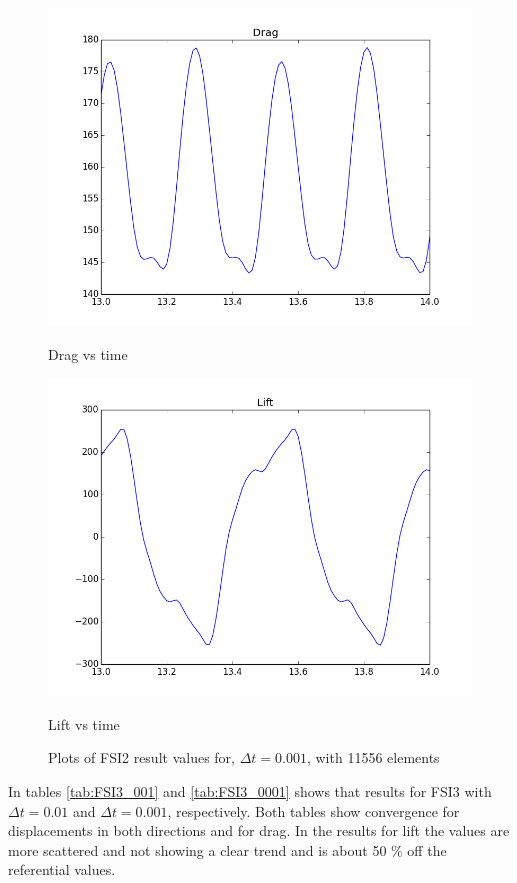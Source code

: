 \begin{figure}[H]
\begin{minipage}[b]{0.6\linewidth}
    \includegraphics[width=0.9\linewidth]{./Verification_Validation/Hron_Turek/FSI2_drag.png} 
    \caption{Drag vs time} 
    \vspace{4ex}
  \end{minipage}%
  \begin{minipage}[b]{0.6\linewidth}
    \centering
    \includegraphics[width=0.9\linewidth]{./Verification_Validation/Hron_Turek/FSI2_lift.png} 
    \caption{Lift vs time} 
    \vspace{4ex}
  \end{minipage} 
  \caption{Plots of FSI2 result values for, $\Delta t = 0.001$, with 11556 elements}
\end{figure}


In tables \ref{tab:FSI3_001} and \ref{tab:FSI3_0001} shows that results for FSI3 with $\Delta t = 0.01$ and $\Delta t = 0.001$, respectively. Both tables show convergence for displacements in both directions and for drag. In the results for lift the values are more scattered and not showing a clear trend and is about 50 \% off the referential values.

